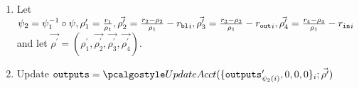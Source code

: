 \begin{enumerate}
    \item Let $\psi_2 = \psi_1^{-1} \circ \psi, 
    \rho_1^\prime = \frac{r_1}{\rho_1}, 
    \vec{\rho_2^\prime} = \frac{r_2 - \rho_2}{\rho_1} - {r_{\textup{\texttt{{bl}}}}}_i, 
    \vec{\rho_3^\prime} = \frac{r_3 - \rho_3}{\rho_1} - {r_{\textup{\texttt{{out}}}}}_i, 
    \vec{\rho_4^\prime} = \frac{r_4 - \rho_4}{\rho_1} - {r_{\textup{\texttt{{in}}}}}_i$ 
    and let $\vec{\rho^\prime} = (\rho_1^\prime, \vec{\rho_2^\prime}, \vec{\rho_3^\prime}, \vec{\rho_4^\prime})$. 
    \vspace{0.1cm}

    \item Update $\outputs = \updacc(\{\outputs'_{\psi_2(i)},0,0,0\}_i; \vec{\rho^\prime})$
    \vspace{0.1cm}


\end{enumerate}
